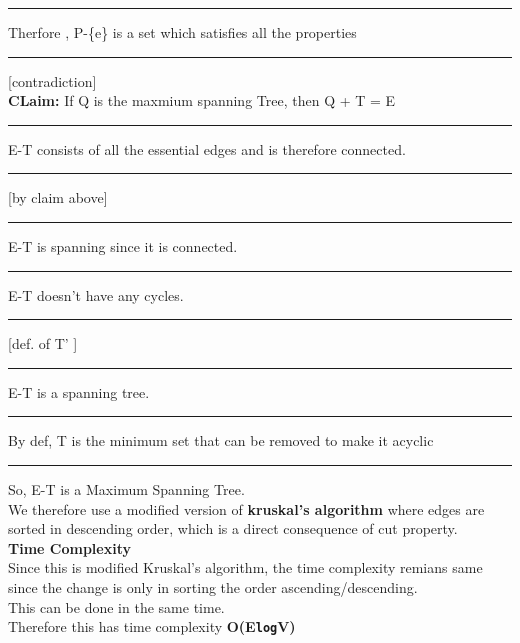 \documentclass{report}
\begin{document}
 \noindent\rule[0.5mm]{1cm}{0pt} Therfore , P-\{e\} is a set which satisfies all the properties \noindent\rule[0.5mm]{1cm}{0pt} [contradiction]
 \vspace*{0.2em}\\
 \textbf{CLaim:} If Q is the maxmium spanning Tree, then Q + T = E\\
 \noindent\rule[0.5mm]{1cm}{0pt} E-T consists of all the essential edges and is therefore connected.\noindent\rule[0.5mm]{1cm}{0pt} [by claim above]\\
 \noindent\rule[0.5mm]{1cm}{0pt} E-T is spanning since it is connected.\\
 \noindent\rule[0.5mm]{1cm}{0pt} E-T doesn't have any cycles. \noindent\rule[0.5mm]{1cm}{0pt}[def. of T' ]\\
 \noindent\rule[0.5mm]{1cm}{0pt} E-T is a spanning tree. \\
 \noindent\rule[0.5mm]{1cm}{0pt} By def, T is the minimum set that can be removed to make it acyclic\\
 \noindent\rule[0.5mm]{1cm}{0pt} So, E-T is a Maximum Spanning Tree.\\
 We therefore use a modified version of \textbf{kruskal's algorithm} where edges are sorted in descending order, which is a direct consequence of cut property.\\
 \textbf{Time Complexity}\\
 Since this is modified Kruskal's algorithm, the time complexity remians same since the change is only in sorting the order ascending/descending.\\
 This can be done in the same time.\\
 Therefore this has time complexity \textbf{O(E\texttt{log}V)}
 
\end{document}
